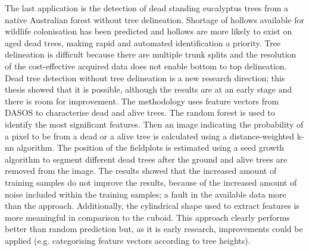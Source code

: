 \documentclass{subfiles}
\begin{document}
\par The last application is the detection of dead standing eucalyptus trees from a native Australian forest without tree delineation. Shortage of hollows available for wildlife colonisation has been predicted and hollows are more likely to exist on aged dead trees, making rapid and automated identification a priority. Tree delineation is difficult because there are multiple trunk splits and the resolution of the cost-effective acquired data does not enable bottom to top delineation. Dead tree detection without tree delineation is a new research direction; this thesis showed that it is possible, although the results are at an early stage and there is room for improvement. The methodology uses feature vectors from DASOS to characterise dead and alive trees. The random forest is used to identify the most significant features. Then an image indicating the probability of a pixel to be from a dead or a alive tree is calculated using a distance-weighted k-nn algorithm. The position of the fieldplots is estimated using a seed growth algorithm to segment different dead trees after the ground and alive trees are removed from the image. The results showed that the increased amount of training samples do not improve the results, because of the increased amount of noise included within the training samples; a fault in the available data more than the approach.  Additionally, the cylindrical shape used to extract features is more meaningful in comparison to the cuboid. This approach clearly performs better than random prediction but, as it is early research, improvements could be applied (e.g. categorising feature vectors according to tree heights). 
\end{document}
